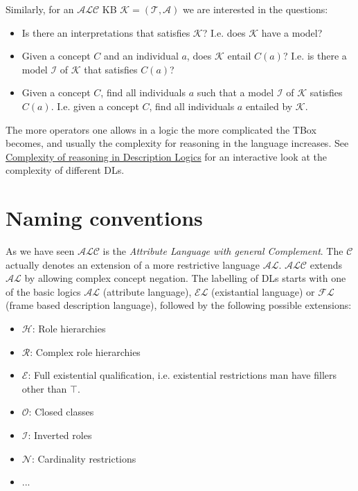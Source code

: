 Similarly, for an $\mathcal{ALC}$ KB $\mathcal{K} = (\mathcal{T}, \mathcal{A})$ we are interested in the questions:
\begin{itemize}
    \item Is there an interpretations that satisfies $\mathcal{K}$? I.e. does $\mathcal{K}$ have a model?
    \item Given a concept $C$ and an individual $a$, does $\mathcal{K}$ entail $C(a)$? I.e. is there a model $\mathcal{I}$ of $\mathcal{K}$ that satisfies $C(a)$?
    \item Given a concept $C$, find all individuals $a$ such that a model $\mathcal{I}$ of $\mathcal{K}$ satisfies $C(a)$. I.e. given a concept $C$, find all individuals $a$ entailed by $\mathcal{K}$.
\end{itemize}

The more operators one allows in a logic the more complicated the TBox becomes, and usually the complexity for reasoning in the language increases. See \href{http://www.cs.man.ac.uk/~ezolin/dl/}{Complexity of reasoning in Description Logics} for an interactive look at the complexity of different DLs.

\section{Naming conventions}

As we have seen $\mathcal{ALC}$ is the \textit{Attribute Language with general Complement}. The $\mathcal{C}$ actually denotes an extension of a more restrictive language $\mathcal{AL}$. $\mathcal{ALC}$ extends $\mathcal{AL}$ by allowing complex concept negation. The labelling of DLs starts with one of the basic logics $\mathcal{AL}$ (attribute language), $\mathcal{EL}$ (existantial language) or $\mathcal{FL}$ (frame based description language), followed by the following possible extensions:
\begin{itemize}
    \item $\mathcal{H}$: Role hierarchies
    \item $\mathcal{R}$: Complex role hierarchies
    \item $\mathcal{E}$: Full existential qualification, i.e. existential restrictions man have fillers other than $\top$.
    \item $\mathcal{O}$: Closed classes
    \item $\mathcal{I}$: Inverted roles
    \item $\mathcal{N}$: Cardinality restrictions
    \item ... 
\end{itemize}




